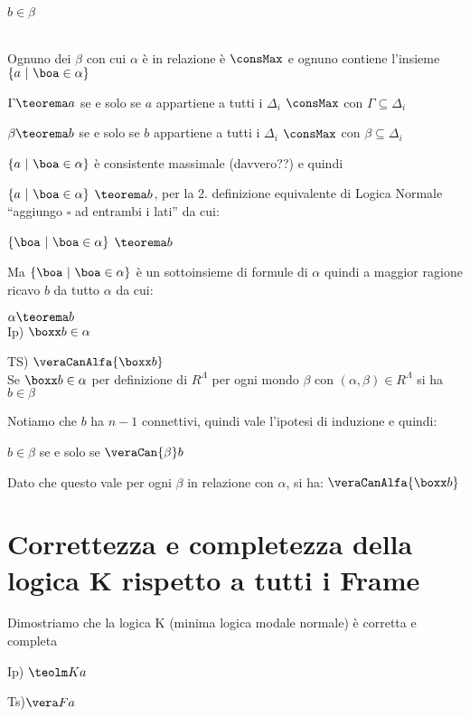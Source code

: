$b\in\beta$

 \\


Ognuno dei $\beta$ con cui $\alpha$ è in relazione è $\consMax$
e ognuno contiene l'insieme $\{a\ |\ \boa\in\alpha\}$ 

$\Gamma\teorema a$ se e solo se $a$ appartiene a tutti i $\Delta_{i}$
$\consMax$ con $\Gamma\subseteq\Delta_{i}$

$\beta\teorema b$ se e solo se $b$ appartiene a tutti i $\Delta_{i}$
$\consMax$ con $\beta\subseteq\Delta_{i}$

$\{a\ |\ \boa\in\alpha\}$ è consistente massimale (davvero??) e quindi

$\{a\ |\ \boa\in\alpha\}$ $\teorema b$, per la 2. definizione equivalente
di Logica Normale ``aggiungo $\square$ ad entrambi i lati'' da
cui:

$\{\boa\ |\ \boa\in\alpha\}$ $\teorema b$

Ma $\{\boa\ |\ \boa\in\alpha\}$ è un sottoinsieme di formule di $\alpha$
quindi a maggior ragione ricavo $b$ da tutto $\alpha$ da cui:

$\alpha\teorema b$\\
Ip) $\boxx b\in\alpha$

TS) $\veraCanAlfa{\boxx b}$\\
Se $\boxx b\in\alpha$ per definizione di $R^{\Lambda}$ per ogni
mondo $\beta$ con $(\alpha,\beta)\in R^{\Lambda}$ si ha $b\in\beta$

Notiamo che $b$ ha $n-1$ connettivi, quindi vale l'ipotesi di induzione
e quindi:

$ $$b\in\beta$ se e solo se $\veraCan{\beta}b$

Dato che questo vale $ $per ogni $\beta$ in relazione con $\alpha$,
si ha: $\veraCanAlfa{\boxx b}$


\section{$ $Correttezza e completezza della logica K rispetto a tutti i Frame}

Dimostriamo che la logica K (minima logica modale normale) è corretta
e completa

Ip) $\teolm Ka$ 

Ts)$\vera Fa$\\


